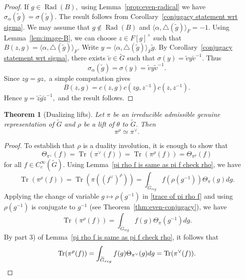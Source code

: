 \documentclass[11pt, a4paper, reqno]{amsart}
\newtheorem{theorem}{Theorem}[section]
\theoremstyle{definition}
\theoremstyle{remark}
\theoremstyle{example}
\theoremstyle{note}
\numberwithin{equation}{section}
\DeclareMathOperator{\tr}{Tr}
\DeclareMathOperator{\reg}{reg}
\DeclareMathOperator{\Rad}{Rad}
\begin{document}
\begin{proof} 
If $g\in \Rad(B),$ using Lemma~\ref{prop:even-radical} we have $\sigma_{\alpha}(\tilde{g})=\sigma(\tilde{g})$. The result follows from Corollary~\ref{conjugacy statement wrt sigma}. We may assume that $g\notin \Rad(B)$  and $\langle \alpha, \triangle(\tilde{g}) \rangle_{F} =-1$. Using Lemma~\ref{lem:image-B}, we can choose $z \in F[g]^{\times}$ such that $B(z, g) = \langle \alpha, \triangle(\tilde{g}) \rangle_{F}.$ Write $y =\langle \alpha, \triangle(\tilde{g}) \rangle_{F}\tilde{g}.$ By Corollary~\ref{conjugacy statement wrt sigma}, there exists $\tilde{v} \in \widetilde{G}$ such that $\sigma(y) = \tilde{v}y \tilde{v}^{-1}$. Thus $$\sigma_\alpha(\tilde{g})= \sigma(y)= \tilde{v}y \tilde{v}^{-1}.$$
Since $zg = gz,$ a simple computation gives $$B(z, g) = c(z, g) c(zg,z^{-1}) c(z, z^{-1}).$$ Hence $y = \tilde{z} \tilde{g} \tilde{z}^{-1},$ and the result follows.
\end{proof}




\begin{theorem}[Dualizing lifts]\label{main theorem 2} Let $\pi$ be an irreducible admissible genuine representation of $\widetilde{G}$ and $\rho$ be a lift of $\theta$ to $\widetilde{G}$. Then 
\[\pi^{\rho}\simeq \pi^{\vee}.\]
\end{theorem}

\begin{proof} To establish that $\rho$ is a duality involution, it is enough to show that 
\[\Theta_{\pi^{\vee}}(f)=\tr(\pi^\vee(f))=\tr(\pi^{{\rho}}(f))=\Theta_{\pi^{\rho}}(f)\] 
 for all $f \in  C_c^\infty(\widetilde G)$.
Using Lemma~\ref{pi rho f is same as pi f check rho}, we have
\begin{equation}\label{trace of pi rho f}
    \tr(\pi^{{\rho}}(f))=\tr(\pi((f^\vee)^{\rho}))=\int_{\widetilde{G}_{reg}} f(\rho(g^{-1}))\Theta_{\pi}(g)dg.
\end{equation}
Applying the change of variable $g\mapsto\rho(g^{-1})$ in \eqref{trace of pi rho f} and using $\rho(g^{-1})$ is conjugate to $g^{-1}$ (see Theorem~\ref{thm:even-conjugacy}), we have 
\[\tr(\pi^{\rho}(f))= %
\int_{\widetilde{G}_{reg}} f(g)\Theta_{\pi}(g^{-1})dg.\]
By part 3) of Lemma~\ref{pi rho f is same as pi f check rho},
it follows that
\[\tr(\pi^{\rho}(f)) %
=\int_{\widetilde{G}_{reg}} f(g)\Theta_{\pi^\vee}(g)dg = \tr({\pi^\vee}(f)).\qedhere\] 
\end{proof}
\end{document}
